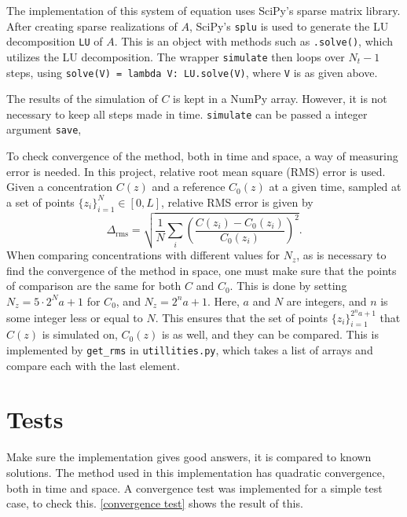 \documentclass{article}
\begin{document}
    The implementation of this system of equation uses SciPy's sparse matrix library. After creating sparse realizations of $A$, SciPy's \verb|splu| is used to generate the LU decomposition \verb|LU| of $A$. This is an object with methods such as \verb|.solve()|, which utilizes the LU decomposition. The wrapper \verb|simulate| then loops over $N_t-1$ steps, using \verb|solve(V) = lambda V: LU.solve(V)|, where \verb|V| is as given above.

    The results of the simulation of $C$ is kept in a NumPy array. However, it is not necessary to keep all steps made in time. \verb|simulate| can be passed a integer argument \verb|save|, 

    To check convergence of the method, both in time and space, a way of measuring error is needed. In this project, relative root mean square (RMS) error is used. Given a concentration $C(z)$ and a reference $C_0(z)$ at a given time, sampled at a set of points $\{z_i\}_{i=1}^N \in [0, L]$, relative RMS error is given by
    \begin{equation*}
        \Delta_\mathrm{rms} = \sqrt{\frac{1}{N}\sum_i \left(\frac{C(z_i) - C_0(z_i)}{C_0(z_i)}\right)^2}.
    \end{equation*}
    When comparing concentrations with different values for $N_z$, as is necessary to find the convergence of the method in space, one must make sure that the points of comparison are the same for both $C$ and $C_0$. This is done by setting $N_z = 5\cdot 2^Na + 1$ for $C_0$, and $N_z = 2^n a + 1$. Here, $a$ and $N$ are integers, and $n$ is some integer less or equal to $N$. This ensures that the set of points $\{z_i\}_{i=1}^{2^na+1}$ that $C(z)$ is simulated on, $C_0(z)$ is as well, and they can be compared. This is implemented by \verb|get_rms| in \verb|utillities.py|, which takes a list of arrays and compare each with the last element. 


    \section*{Tests}
    Make sure the implementation gives good answers, it is compared to known solutions. The method used in this implementation has quadratic convergence, both in time and space. A convergence test was implemented for a simple test case, to check this. \autoref{convergence test} shows the result of this. 
\end{document}

